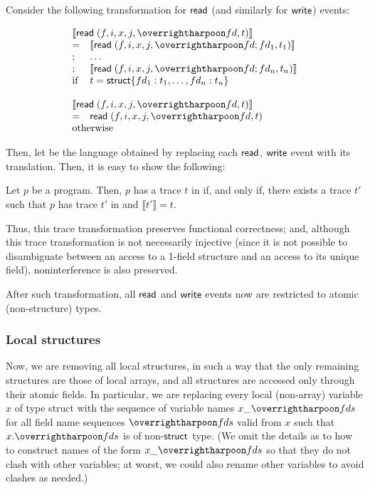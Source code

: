 Consider the following transformation for  $\text{\textsf{read}}$ (and
similarly for $\text{\textsf{write}}$) events:

\[
\begin{array}{ll}
  \multicolumn{2}{l}{\llbracket \symread\;(f, i, x, j, \ls{fd}, t) \rrbracket} \\
  = & \llbracket \symread\; (f, i, x, j, \ls{fd};fd_1, t_1) \rrbracket \\
  ; & \dots \\
  ; & \llbracket \symread\; (f, i, x, j, \ls{fd};fd_n, t_n) \rrbracket \\
  \text{if} & t = \kw{struct} \{ fd_1: t_1, \dots, fd_n: t_n \} \\
\\
  \multicolumn{2}{l}{\llbracket \symread\;(f, i, x, j, \ls{fd}, t) \rrbracket} \\
  = & \symread\; (f, i, x, j, \ls{fd}, t) \\
  \multicolumn{2}{l}{\text{otherwise}}
\end{array}
\]

Then, let  be the  language obtained by replacing each
$\text{\textsf{read}}$, $\text{\textsf{write}}$ event with its translation. Then, it is easy
to show the following:
\begin{lemma}
  Let $p$ be a  program. Then, $p$ has a trace $t$ in  if, and
  only if, there exists a trace $t'$ such that $p$ has trace $t'$ in
   and $\llbracket t' \rrbracket = t$.
\end{lemma}

Thus, this trace transformation preserves functional correctness; and,
although this trace transformation is not necessarily injective (since
it is not possible to disambiguate between an access to a 1-field
structure and an access to its unique field), noninterference is also
preserved.

After such transformation, all $\text{\textsf{read}}$ and $\text{\textsf{write}}$ events now
are restricted to atomic (non-structure) types.

\subsubsection{Local structures} \label{sec:local-struct-detail}

Now, we are removing all local structures, in such a way that the only
remaining structures are those of local arrays, and all structures are
accessed only through their atomic fields. In particular, we are
replacing every local (non-array) variable $x$ of type struct with the
sequence of variable names $x\_\ls{fds}$ for all field name sequences
$\ls{fds}$ valid from $x$ such that $x.\ls{fds}$ is of
non-$\text{\textsf{struct}}$ type. (We omit the details as to how to construct
names of the form $x\_\ls{fds}$ so that they do not clash with other
variables; at worst, we could also rename other variables to avoid
clashes as needed.)

